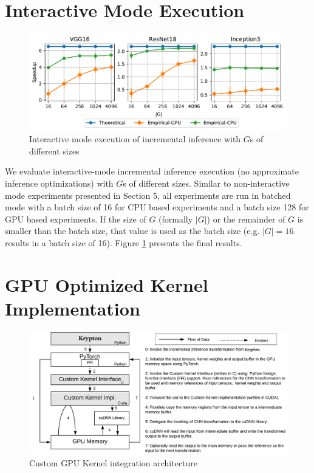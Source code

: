 \appendix

\section{Interactive Mode Execution}

\begin{figure}[t]
\includegraphics[width=\columnwidth]{images/interactive_experiment.pdf}
\caption{Interactive mode execution of incremental inference with $G$s of different sizes}
\label{fig:interactive_experiment}
\end{figure}

We evaluate interactive-mode incremental inference execution (no approximate inference optimizations) with $G$s of different sizes.
Similar to non-interactive mode experiments presented in Section 5, all experiments are run in batched mode with a batch size of 16 for CPU based experiments and a batch size 128 for GPU based experiments.
If the size of $G$ (formally $|G|$) or the remainder of $G$ is smaller than the batch size, that value is used as the batch size (e.g. $|G| = 16$ results in a batch size of 16).
Figure \ref{fig:interactive_experiment} presents the final results.

\section{GPU Optimized Kernel Implementation}

\begin{figure}[t]
\includegraphics[width=\columnwidth]{images/gpu_kernel_impl.pdf}
\caption{Custom GPU Kernel integration architecture}
\label{fig:custom_kernel_integration}
\end{figure}

